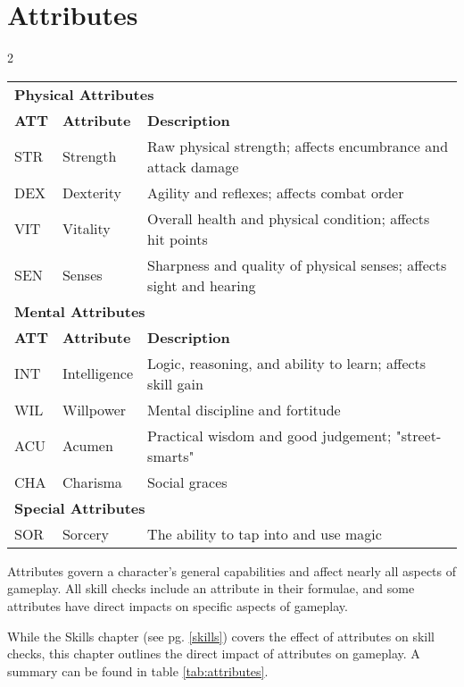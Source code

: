 \chapter{Attributes}\label{attributes}

\begin{multicols*}{2}
    \begin{table*}[ht]
        \unclassedrowcolors
        \begin{tabularx}{\textwidth}{l l X}
            \multicolumn{3}{l}{\textbf{Physical Attributes}} \\
            \textbf{ATT} & \textbf{Attribute} & \textbf{Description} \\
            STR & Strength & Raw physical strength; affects encumbrance and attack damage \\
            DEX & Dexterity & Agility and reflexes; affects combat order \\
            VIT & Vitality & Overall health and physical condition; affects hit points \\
            SEN & Senses & Sharpness and quality of physical senses; affects sight and hearing \\
            \multicolumn{3}{l}{\bfseries{Mental Attributes}} \\
            \textbf{ATT} & \textbf{Attribute} & \textbf{Description} \\
            INT & Intelligence & Logic, reasoning, and ability to learn; affects skill gain \\
            WIL & Willpower & Mental discipline and fortitude \\
            ACU & Acumen & Practical wisdom and good judgement; "street-smarts" \\
            CHA & Charisma & Social graces \\
            \multicolumn{3}{l}{\textbf{Special Attributes}} \\
            SOR & Sorcery & The ability to tap into and use magic \\
        \end{tabularx}
        \caption{Attributes}
        \label{tab:attributes}
    \end{table*}
    Attributes govern a character's general capabilities and affect nearly all
    aspects of gameplay. All skill checks include an attribute in their formulae,
    and some attributes have direct impacts on specific aspects of gameplay.

    While the Skills chapter (see pg. \ref{skills}) covers the effect of attributes
    on skill checks, this chapter outlines the direct impact of attributes on
    gameplay. A summary can be found in table \ref{tab:attributes}.


\end{multicols*}
